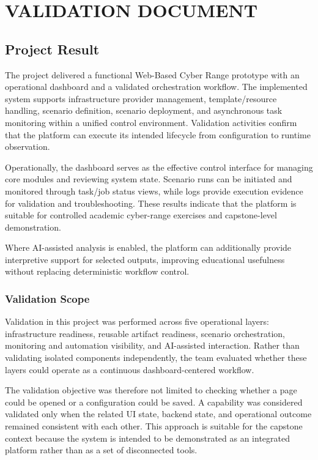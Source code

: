 \chapter{VALIDATION DOCUMENT}

\section{Project Result}
The project delivered a functional Web-Based Cyber Range prototype with an operational dashboard and a validated orchestration workflow. The implemented system supports infrastructure provider management, template/resource handling, scenario definition, scenario deployment, and asynchronous task monitoring within a unified control environment. Validation activities confirm that the platform can execute its intended lifecycle from configuration to runtime observation.

Operationally, the dashboard serves as the effective control interface for managing core modules and reviewing system state. Scenario runs can be initiated and monitored through task/job status views, while logs provide execution evidence for validation and troubleshooting. These results indicate that the platform is suitable for controlled academic cyber-range exercises and capstone-level demonstration.

Where AI-assisted analysis is enabled, the platform can additionally provide interpretive support for selected outputs, improving educational usefulness without replacing deterministic workflow control.

\subsection{Validation Scope}
Validation in this project was performed across five operational layers: infrastructure readiness, reusable artifact readiness, scenario orchestration, monitoring and automation visibility, and AI-assisted interaction. Rather than validating isolated components independently, the team evaluated whether these layers could operate as a continuous dashboard-centered workflow.

The validation objective was therefore not limited to checking whether a page could be opened or a configuration could be saved. A capability was considered validated only when the related UI state, backend state, and operational outcome remained consistent with each other. This approach is suitable for the capstone context because the system is intended to be demonstrated as an integrated platform rather than as a set of disconnected tools.

